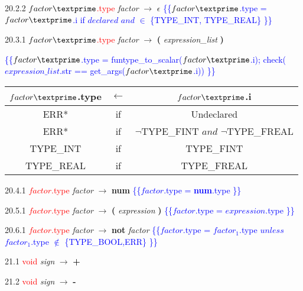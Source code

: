 \documentclass[10pt]{article}
\begin{document}
20.2.2 \textcolor{red}{$factor\textprime$.type} \emph{factor\textprime} $\rightarrow$ $\epsilon$ \textcolor{blue}{\{\{$factor\textprime$.type = $factor\textprime$.i if $declared$ $and$ $\in$ \{TYPE_INT, TYPE_REAL\} \}\}}

20.3.1 \textcolor{red}{$factor\textprime$.type} \emph{factor\textprime} $\rightarrow$ \textbf{(} \emph{expression\_list} \textbf{)}

\textcolor{blue}{\{\{$factor\textprime$.type = funtype_to_scalar($factor\textprime$.i); check($expression\_list$.str == get_args($factor\textprime$.i)) \}\}}

\begin{tabular}[t]{|c|c|c|}
  \hline

  $factor\textprime$.type & \textbf{$\leftarrow$} & $factor\textprime$.i \\

  \hline
  ERR* & if & Undeclared \\
  ERR* & if & $\neg$TYPE_FINT $and$ $\neg$TYPE_FREAL \\
  TYPE_INT & if & TYPE_FINT \\
  TYPE_REAL & if & TYPE_FREAL \\

  \hline

\end{tabular}

20.4.1 \textcolor{red}{$factor$.type} \emph{factor} $\rightarrow$ \textbf{num} \textcolor{blue}{\{\{$factor$.type = \textbf{num}.type \}\}}

20.5.1 \textcolor{red}{$factor$.type} \emph{factor} $\rightarrow$ \textbf{(} \emph{expression} \textbf{)} \textcolor{blue}{\{\{$factor$.type = $expression$.type \}\}}

20.6.1 \textcolor{red}{$factor$.type} \emph{factor} $\rightarrow$ \textbf{not} \emph{factor} \textcolor{blue}{\{\{$factor$.type = $factor_1$.type $unless$ $factor_1$.type $\notin$ \{TYPE_BOOL,ERR\} \}\}}

21.1 \textcolor{red}{void} \emph{sign} $\rightarrow$ \textbf{+}

21.2 \textcolor{red}{void} \emph{sign} $\rightarrow$ \textbf{-}
\end{document}
